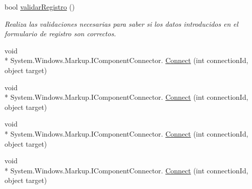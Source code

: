 \begin{DoxyCompactItemize}
bool \hyperlink{class_proyecto___integrador__3_1_1_main_window_a8710779e7a7c19e36d1c910e47fce573}{validar\-Registro} ()
\begin{DoxyCompactList}\small\item\em Realiza las validaciones necesarias para saber si los datos introducidos en el formulario de registro son correctos. \end{DoxyCompactList}\item 
void \\*
System.\-Windows.\-Markup.\-I\-Component\-Connector. \hyperlink{class_proyecto___integrador__3_1_1_main_window_a4b924975ba45d78542912ddd7d49152b}{Connect} (int connection\-Id, object target)
\item 
void \\*
System.\-Windows.\-Markup.\-I\-Component\-Connector. \hyperlink{class_proyecto___integrador__3_1_1_main_window_a4b924975ba45d78542912ddd7d49152b}{Connect} (int connection\-Id, object target)
\item 
void \\*
System.\-Windows.\-Markup.\-I\-Component\-Connector. \hyperlink{class_proyecto___integrador__3_1_1_main_window_a4b924975ba45d78542912ddd7d49152b}{Connect} (int connection\-Id, object target)
\item 
void \\*
System.\-Windows.\-Markup.\-I\-Component\-Connector. \hyperlink{class_proyecto___integrador__3_1_1_main_window_a4b924975ba45d78542912ddd7d49152b}{Connect} (int connection\-Id, object target)
\end{DoxyCompactItemize}
